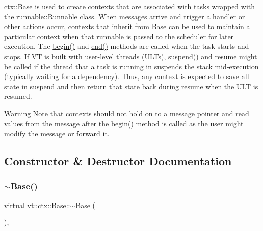 {\ttfamily \hyperlink{structvt_1_1ctx_1_1_base}{ctx\+::\+Base}} is used to create contexts that are associated with tasks wrapped with the {\ttfamily runnable\+::\+Runnable} class. When messages arrive and trigger a handler or other actions occur, contexts that inherit from {\ttfamily \hyperlink{structvt_1_1ctx_1_1_base}{Base}} can be used to maintain a particular context when that runnable is passed to the scheduler for later execution. The {\ttfamily \hyperlink{structvt_1_1ctx_1_1_base_aab5524952e1bb163ccba5df64a303168}{begin()}} and {\ttfamily \hyperlink{structvt_1_1ctx_1_1_base_a113bac732b2831caa8eed11609ccaf0e}{end()}} methods are called when the task starts and stops. If VT is built with user-\/level threads (U\+L\+Ts), {\ttfamily \hyperlink{structvt_1_1ctx_1_1_base_a445badaaad72b44313084b2c95a13003}{suspend()}} and {\ttfamily resume} might be called if the thread that a task is running in suspends the stack mid-\/execution (typically waiting for a dependency). Thus, any context is expected to save all state in suspend and then return that state back during resume when the U\+LT is resumed.

\begin{DoxyWarning}{Warning}
Note that contexts should not hold on to a message pointer and read values from the message after the {\ttfamily \hyperlink{structvt_1_1ctx_1_1_base_aab5524952e1bb163ccba5df64a303168}{begin()}} method is called as the user might modify the message or forward it. 
\end{DoxyWarning}


\subsection{Constructor \& Destructor Documentation}
\mbox{\label{structvt_1_1ctx_1_1_base_a11811118c1c91d93e7679610bf8377f2}} 
\subsubsection{\texorpdfstring{$\sim$\+Base()}{~Base()}}
{\footnotesize\ttfamily virtual vt\+::ctx\+::\+Base\+::$\sim$\+Base (\begin{DoxyParamCaption}{ }\end{DoxyParamCaption})\hspace{0.3cm}{\ttfamily [virtual]}, {\ttfamily [default]}}



